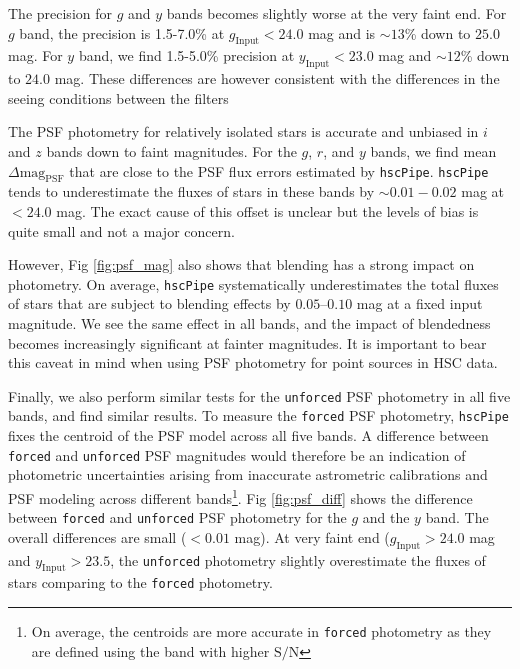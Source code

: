 \documentclass[useamsfonts]{pasj01}
\def\hscpipe{\texttt{hscPipe}}
\def\forced{\texttt{forced}}
\def\unforced{\texttt{unforced}}
\def\s2n{{$\mathrm{S}/\mathrm{N}$}}
\begin{document}
    The precision for $g$ and $y$ bands becomes slightly worse at the very faint end. 
    For $g$ band, the precision is 1.5-7.0\% at $g_{\mathrm{Input}} < 24.0$ mag and is
    ${\sim}13$\% down to $25.0$ mag.
    For $y$ band, we find 1.5-5.0\% precision at $y_{\mathrm{Input}} < 23.0$ mag and
    ${\sim}12$\% down to $24.0$ mag. 
    These differences are however consistent with the differences in the seeing 
    conditions between the filters 
    

    The PSF photometry for relatively isolated stars is accurate and unbiased in $i$ 
    and $z$ bands down to faint magnitudes. 
    For the $g$, $r$, and $y$ bands, we find mean $\Delta \mathrm{mag}_{\mathrm{PSF}}$
    that are close to the PSF flux errors estimated by \hscpipe{}.  
    \hscpipe{} tends to underestimate the fluxes of stars in these bands by 
    ${\sim}0.01-0.02$ mag at $< 24.0$ mag. 
    The exact cause of this offset is unclear but the levels of bias is quite small 
    and not a major concern.  

	However, Fig \ref{fig:psf_mag} also shows that blending has a strong impact on 
	photometry.  
	On average, \hscpipe{} systematically underestimates the total fluxes of stars 
	that are subject to blending effects by $0.05$--$0.10$ mag at a fixed input 
	magnitude.
    We see the same effect in all bands, and the impact of blendedness becomes
    increasingly significant at fainter magnitudes.
    It is important to bear this caveat in mind when using PSF photometry for point
    sources in HSC data.

	Finally, we also perform similar tests for the \unforced{} PSF photometry in all 
	five bands, and find similar results. 
	To measure the \forced{} PSF photometry, \hscpipe{} fixes the centroid of the PSF 
	model across all five bands. 
	A difference between \forced{} and \unforced{} PSF magnitudes would therefore be 
	an indication of photometric uncertainties arising from inaccurate astrometric 
	calibrations and PSF modeling across different bands\footnote{On average, the 
	centroids are more accurate in \forced{} photometry as they are defined using 
	the band with higher \s2n{}}. 
	Fig \ref{fig:psf_diff} shows the difference between \forced{} and \unforced{} 
	PSF photometry for the $g$ and the $y$ band. 
	The overall differences are small ($<0.01$ mag). 
	At very faint end ($g_{\mathrm{Input}}>24.0$ mag and $y_{\mathrm{Input}}>23.5$,
	the \unforced{} photometry slightly overestimate the fluxes of stars comparing 
	to the \forced{} photometry. 
	
\end{document}
